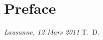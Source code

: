 \cleardoublepage
\chapter*{Preface}

\bigskip
 
\noindent\textit{Lausanne, 12 Mars 2011}
\hfill T.~D.
